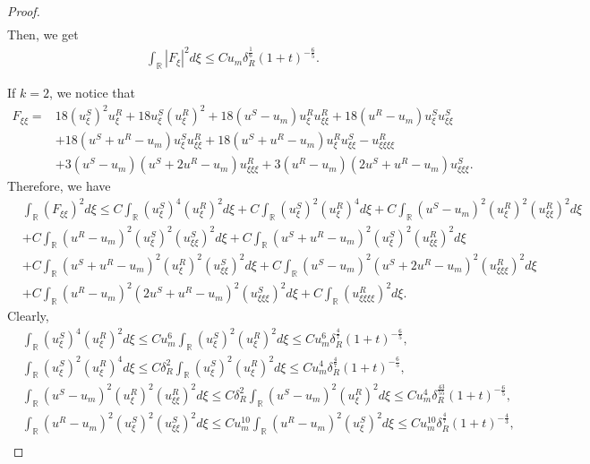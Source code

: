 \documentclass[10pt,reqno]{amsart}
\numberwithin{equation}{section}
\begin{document}
\begin{proof}
\begin{align*}
		\end{align*} 
		Then, we get 
		\begin{align*}
			\int_{\mathbb{R}}\left|F_{\xi}\right|^2d\xi\leq Cu_m\delta_R^{\frac{1}{6}}(1+t)^{-\frac{6}{5}}.
		\end{align*}\par
		If $k=2$, we notice that 
		\begin{align*}
			F_{\xi\xi}=&18(u_{\xi}^S)^2u_{\xi}^R+18u_{\xi}^S(u_{\xi}^R)^2+18(u^S-u_m)u_{\xi}^Ru_{\xi\xi}^R+18(u^R-u_m)u_{\xi}^Su_{\xi\xi}^S\\
			&+18(u^S+u^R-u_m)u_{\xi}^Su_{\xi\xi}^R+18(u^S+u^R-u_m)u_{\xi}^Ru_{\xi\xi}^S-u_{\xi\xi\xi\xi}^R\\
			&+3(u^S-u_m)(u^S+2u^R-u_m)u_{\xi\xi\xi}^R+3(u^R-u_m)(2u^S+u^R-u_m)u_{\xi\xi\xi}^S.
		\end{align*}
		Therefore, we have
		\begin{align*}
			&\int_{\mathbb{R}}(F_{\xi\xi})^2d\xi
			\leq C\int_{\mathbb{R}}(u_{\xi}^S)^4(u_{\xi}^R)^2d\xi+C\int_{\mathbb{R}}(u_{\xi}^S)^2(u_{\xi}^R)^4d\xi+C\int_{\mathbb{R}}(u^S-u_m)^2(u_{\xi}^R)^2(u_{\xi\xi}^R)^2d\xi\\
			&+C\int_{\mathbb{R}}(u^R-u_m)^2(u_{\xi}^S)^2(u_{\xi\xi}^S)^2d\xi+C\int_{\mathbb{R}}(u^S+u^R-u_m)^2(u_{\xi}^S)^2(u_{\xi\xi}^R)^2d\xi\\
			&+C\int_{\mathbb{R}}(u^S+u^R-u_m)^2(u_{\xi}^R)^2(u_{\xi\xi}^S)^2d\xi+C\int_{\mathbb{R}}(u^S-u_m)^2(u^S+2u^R-u_m)^2(u_{\xi\xi\xi}^R)^2d\xi\\
			&+C\int_{\mathbb{R}}(u^R-u_m)^2(2u^S+u^R-u_m)^2(u_{\xi\xi\xi}^S)^2d\xi+C\int_{\mathbb{R}}(u_{\xi\xi\xi\xi}^R)^2d\xi.
		\end{align*}
		Clearly,
		\begin{align*}
			&\int_{\mathbb{R}}(u_{\xi}^S)^4(u_{\xi}^R)^2d\xi\leq Cu_m^6\int_{\mathbb{R}}(u_{\xi}^S)^2(u_{\xi}^R)^2d\xi\leq Cu_m^6\delta_R^{\frac{4}{7}}(1+t)^{-\frac{6}{5}},\\
			&\int_{\mathbb{R}}(u_{\xi}^S)^2(u_{\xi}^R)^4d\xi\leq C\delta_{R}^2\int_{\mathbb{R}}(u_{\xi}^S)^2(u_{\xi}^R)^2d\xi\leq Cu_m^4\delta_R^{\frac{4}{7}}(1+t)^{-\frac{6}{5}},\\
			&\int_{\mathbb{R}}(u^S-u_m)^2(u_{\xi}^R)^2(u_{\xi\xi}^R)^2d\xi\leq C\delta_{R}^2\int_{\mathbb{R}}(u^S-u_m)^2(u_{\xi}^R)^2d\xi\leq Cu_m^4\delta_R^{\frac{43}{55}} (1+t)^{-\frac{6}{5}},\\
			&\int_{\mathbb{R}}(u^R-u_m)^2(u_{\xi}^S)^2(u_{\xi\xi}^S)^2d\xi\leq Cu_m^{10}\int_{\mathbb{R}}(u^R-u_m)^2(u_{\xi}^S)^2d\xi\leq Cu_m^{10}\delta_R^{\frac{4}{7}}(1+t)^{-\frac{4}{3}},\\

\end{align*}
\end{proof}
\end{document}
